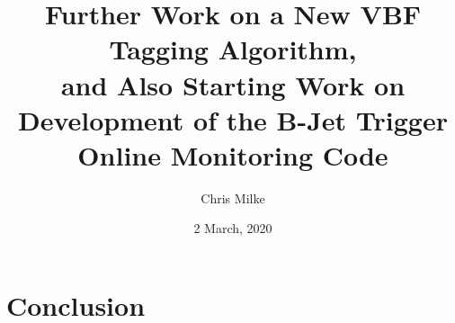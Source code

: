 \documentclass{beamer}
\begin{document}
    \title{Further Work on a New VBF Tagging Algorithm,\\ and Also Starting Work on Development of the B-Jet Trigger Online Monitoring Code}
    \author{Chris Milke}
    \date{2 March, 2020}

    \frame{\titlepage}




    
    
    

    \section{Conclusion}

    
    
\end{document}
